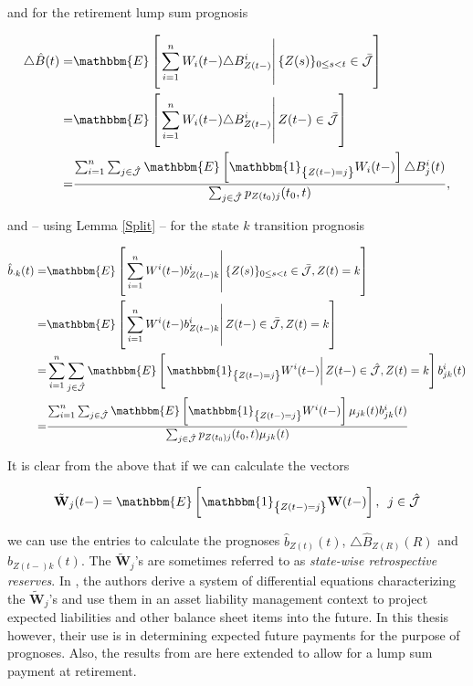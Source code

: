 \documentclass{book}
\newcommand{\1}[1]{\mathbbm{1}_{\left\lbrace #1 \right\rbrace}}
\newcommand{\expec}[1][def]{\mathbbm{E} \left[ #1 \right]}
\newcommand{\econd}[2][def]{\mathbbm{E} \left[ \left. #1 \right| #2 \right]}
\theoremstyle{break}
\theoremstyle{remark}
\numberwithin{equation}{section}
\begin{document}
and for the retirement lump sum prognosis

\begin{align*}
\triangle \hat{B}(t) =& \econd[\sum_{i=1}^n W_i(t-) \triangle B_{Z(t-)}^i]{\{Z(s) \}_{0 \leq s < t} \in \bar{\mathcal{J}}} \\
=& \econd[\sum_{i=1}^n W_i(t-) \triangle B_{Z(t-)}^i]{Z(t-) \in \bar{\mathcal{J}}} \\
=&\frac{\sum_{i=1}^n \sum_{j \in \hat{\mathcal{J}}} \expec[\1{Z(t-)=j} W_i(t-)] \triangle B_j^i(t)}{\sum_{j \in \hat{\mathcal{J}}} p_{Z(t_0)j}(t_0,t)},
\end{align*}

and -- using Lemma \ref{Split} -- for the state $k$ transition prognosis

\begin{align*}
\hat{b}_{\cdot k}(t) =& \econd[\sum_{i=1}^n W^i(t-)b_{Z(t-)k}^i]{\{Z(s) \}_{0 \leq s < t} \in \bar{\mathcal{J}}, Z(t)=k} \\
=& \econd[\sum_{i=1}^n W^i(t-)b_{Z(t-)k}^i]{Z(t-) \in \bar{\mathcal{J}}, Z(t)=k} \\
=& \sum_{i=1}^n \sum_{j \in \hat{\mathcal{J}}} \econd[\1{Z(t-)=j} W^i(t-)]{Z(t-) \in \hat{\mathcal{J}}, Z(t) = k} b_{jk}^i(t) \\
=& \frac{\sum_{i=1}^n \sum_{j \in \hat{\mathcal{J}}} \expec[\1{Z(t-)=j} W^i(t-)] \mu_{jk}(t) b_{jk}^i(t)}{\sum_{j \in \hat{\mathcal{J}}} p_{Z(t_0)j}(t_0,t) \mu_{jk}(t)}
\end{align*}

It is clear from the above that if we can calculate the vectors

\begin{align*}
\tilde{\textbf{W}}_j(t-) = \expec[\1{Z(t-)=j} \textbf{W}(t-)], \, \, \, j \in \hat{\mathcal{J}}
\end{align*}


we can use the entries to calculate the prognoses $\hat{b}_{Z(t)}(t)$, $\triangle  \hat{B}_{Z(R)}(R)$ and $\hat{b}_{Z(t-)k}(t)$. The $\tilde{\textbf{W}}_j$'s are sometimes referred to as \textit{state-wise retrospective reserves}. In \cite{Lollike}, the authors derive a system of differential equations characterizing the $\tilde{\textbf{W}}_j$'s and use them in an asset liability management context to project expected liabilities and other balance sheet items into the future. In this thesis however, their use is in determining expected future payments for the purpose of prognoses. Also, the results from \cite{Lollike} are here extended to allow for a lump sum payment at retirement.
\end{document}
